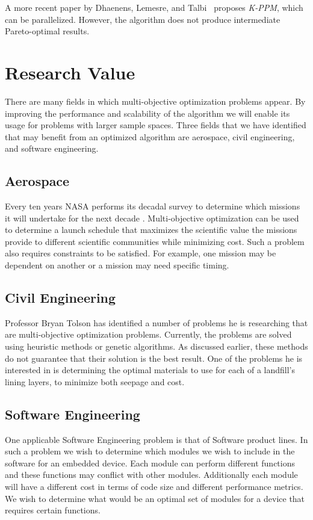 \documentclass[11pt]{article}
\begin{document}
A more recent paper by Dhaenens, Lemesre, and Talbi~\cite{ref:kppm}
proposes \textit{\mbox{K-PPM}}, which can be parallelized. However, the
algorithm does not produce intermediate Pareto-optimal results.

\section{Research Value}
There are many fields in which multi-objective optimization problems
appear. By improving the performance and scalability of the algorithm
we will enable its usage for problems with larger sample spaces. Three
fields that we have identified that may benefit from an optimized
algorithm are aerospace, civil engineering, and software engineering.

\subsection{Aerospace}
Every ten years NASA performs its decadal survey to determine which
missions it will undertake for the next decade \cite{ref:decadal}.
Multi-objective optimization can be used to determine a launch schedule
that maximizes the scientific value the missions provide to different
scientific communities while minimizing cost. Such a problem also
requires constraints to be satisfied. For example, one mission may be
dependent on another or a mission may need specific timing.

\subsection{Civil Engineering}
Professor Bryan Tolson has identified a number of problems he is
researching that are multi-objective optimization problems. Currently,
the problems are solved using heuristic methods or genetic algorithms.
As discussed earlier, these methods do not guarantee that their
solution is the best result. One of the problems he is interested in is
determining the optimal materials to use for each of a landfill's
lining layers, to minimize both seepage and cost.


\subsection{Software Engineering}
One applicable Software Engineering problem is that of Software product
lines. In such a problem we wish to determine which modules we wish to
include in the software for an embedded device. Each module can perform
different functions and these functions may conflict with other
modules. Additionally each module will have a different cost in terms
of code size and different performance metrics. We wish to determine
what would be an optimal set of modules for a device that requires
certain functions.
\end{document}
